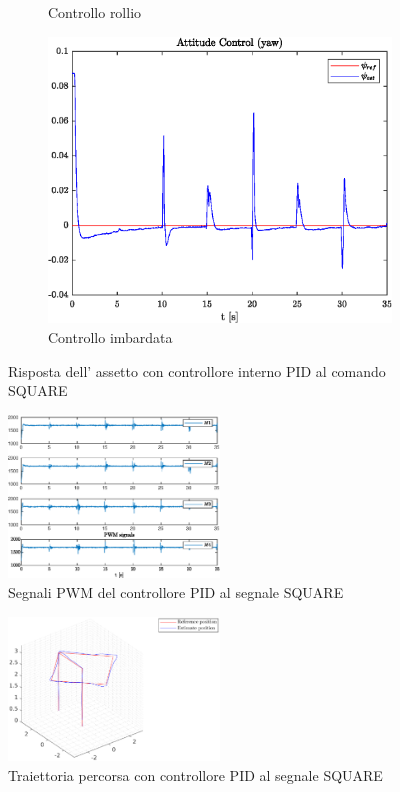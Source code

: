 \begin{figure}
\begin{subfigure}{0.45\textwidth}
		\caption{Controllo rollio}
	\end{subfigure}
	\hfill
	\begin{subfigure}{0.45\textwidth}
		\centering
		\includegraphics[width=1\textwidth]{Simulazioni/Figure/PID/SQUARE/AttitudeControlYaw}
		\caption{Controllo imbardata}
	\end{subfigure}
	\caption{Risposta dell' assetto con controllore interno PID al comando SQUARE}
\end{figure}


\begin{figure}
	\centering
	\includegraphics[width=0.5\textwidth]{Simulazioni/Figure/PID/SQUARE/PWM}
	\caption{Segnali PWM del controllore PID al segnale SQUARE}
\end{figure}
\begin{figure}
	\centering
	\includegraphics[width=0.5\textwidth]{Simulazioni/Figure/PID/SQUARE/Trajectory}
	\caption{Traiettoria percorsa con controllore PID al segnale SQUARE}
\end{figure}

